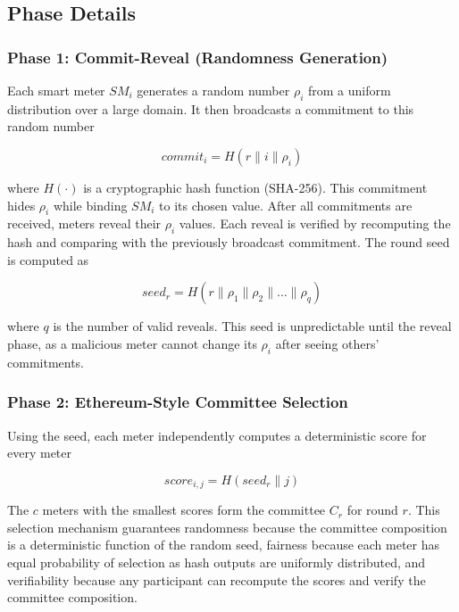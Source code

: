 \documentclass[conference]{IEEEtran}
\begin{document}
\subsection{Phase Details}

\subsubsection{Phase 1: Commit-Reveal (Randomness Generation)}

Each smart meter $SM_i$ generates a random number $\rho_i$ from a uniform distribution over a large domain. It then broadcasts a commitment to this random number

\begin{equation}
\mathit{commit}_i = H(r \parallel i \parallel \rho_i)
\end{equation}

where $H(\cdot)$ is a cryptographic hash function (SHA-256). This commitment hides $\rho_i$ while binding $SM_i$ to its chosen value. After all commitments are received, meters reveal their $\rho_i$ values. Each reveal is verified by recomputing the hash and comparing with the previously broadcast commitment. The round seed is computed as

\begin{equation}
\mathit{seed}_r = H(r \parallel \rho_1 \parallel \rho_2 \parallel \ldots \parallel \rho_q)
\end{equation}

where $q$ is the number of valid reveals. This seed is unpredictable until the reveal phase, as a malicious meter cannot change its $\rho_i$ after seeing others' commitments.

\subsubsection{Phase 2: Ethereum-Style Committee Selection}

Using the seed, each meter independently computes a deterministic score for every meter

\begin{equation}
\mathit{score}_{i,j} = H(\mathit{seed}_r \parallel j)
\end{equation}

The $c$ meters with the smallest scores form the committee $C_r$ for round $r$. This selection mechanism guarantees randomness because the committee composition is a deterministic function of the random seed, fairness because each meter has equal probability of selection as hash outputs are uniformly distributed, and verifiability because any participant can recompute the scores and verify the committee composition.
\end{document}
